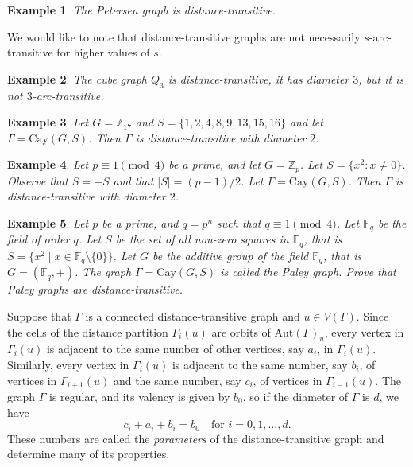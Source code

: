 \documentclass[12pt,a4paper,openany]{book}
\newtheorem{example}{Example}[section]
\begin{document}
\begin{example}
The Petersen graph is distance-transitive.
\end{example}

We would like to note that distance-transitive graphs are not necessarily $s$-arc-transitive for higher values of $s$.

\begin{example}
The cube graph $Q_3$ is distance-transitive, it has diameter $3$, but it is not $3$-arc-transitive.
\end{example}

\begin{example}
Let $G = \mathbb{Z}_{17}$ and $S = \{1, 2, 4, 8, 9, 13, 15, 16\}$ and let $\Gamma = \text{Cay}(G, S)$. Then $\Gamma$ is distance-transitive with diameter $2$.
\end{example}

\begin{example}
Let $p \equiv 1 \pmod{4}$ be a prime, and let $G = \mathbb{Z}_p$. Let $S = \{x^2 : x \neq 0\}$. Observe that $S = -S$ and that $|S| = (p - 1)/2$. Let $\Gamma = \text{Cay}(G, S)$. Then $\Gamma$ is distance-transitive with diameter $2$.
\end{example}

\begin{example}
Let $p$ be a prime, and $q = p^n$ such that $q \equiv 1 \pmod{4}$. Let $\mathbb{F}_q$ be the field of order $q$. Let $S$ be the set of all non-zero squares in $\mathbb{F}_q$, that is $S = \{x^2 \mid x \in \mathbb{F}_q \setminus \{0\}\}$. Let $G$ be the additive group of the field $\mathbb{F}_q$, that is $G = (\mathbb{F}_q, +)$. The graph $\Gamma = \text{Cay}(G, S)$ is called the \emph{Paley graph}. Prove that Paley graphs are distance-transitive.
\end{example}

Suppose that $\Gamma$ is a connected distance-transitive graph and $u \in V(\Gamma)$. Since the cells of the distance partition $\Gamma_i(u)$ are orbits of $\text{Aut}(\Gamma)_u$, every vertex in $\Gamma_i(u)$ is adjacent to the same number of other vertices, say $a_i$, in $\Gamma_i(u)$. Similarly, every vertex in $\Gamma_i(u)$ is adjacent to the same number, say $b_i$, of vertices in $\Gamma_{i+1}(u)$ and the same number, say $c_i$, of vertices in $\Gamma_{i-1}(u)$. The graph $\Gamma$ is regular, and its valency is given by $b_0$, so if the diameter of $\Gamma$ is $d$, we have
\[
c_i + a_i + b_i = b_0 \quad \text{for } i = 0, 1, \dots, d.
\]
These numbers are called the \emph{parameters} of the distance-transitive graph and determine many of its properties.
\end{document}

